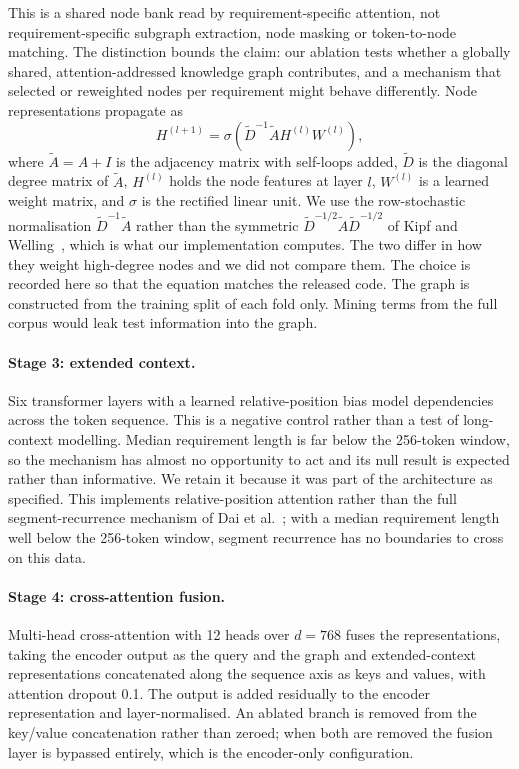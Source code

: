\documentclass[11pt,a4paper]{article}
\begin{document}
This is a shared node bank read by requirement-specific attention, not requirement-specific subgraph
extraction, node masking or token-to-node matching. The distinction bounds the claim: our ablation tests
whether a globally shared, attention-addressed knowledge graph contributes, and a mechanism that selected
or reweighted nodes per requirement might behave differently. Node representations propagate as
\begin{equation}
H^{(l+1)} = \sigma\!\left(\tilde{D}^{-1} \tilde{A} H^{(l)} W^{(l)}\right),
\end{equation}
where $\tilde{A} = A + I$ is the adjacency matrix with self-loops added, $\tilde{D}$ is the
diagonal degree matrix of $\tilde{A}$, $H^{(l)}$ holds the node features at layer $l$,
$W^{(l)}$ is a learned weight matrix, and $\sigma$ is the rectified linear unit. We use the
row-stochastic normalisation $\tilde{D}^{-1}\tilde{A}$ rather than the symmetric
$\tilde{D}^{-1/2}\tilde{A}\tilde{D}^{-1/2}$ of Kipf and Welling~\cite{kipf2017}, which is
what our implementation computes. The two differ in how they weight high-degree nodes and
we did not compare them. The choice is recorded here so that the equation matches the
released code. The graph
is constructed from the training split of each fold only. Mining terms from the full corpus would leak test information into the graph.

\paragraph{Stage 3: extended context.}
Six transformer layers with a learned relative-position bias model dependencies across the
token sequence. This is a negative control rather than a test of long-context modelling. Median requirement
length is far below the 256-token window, so the mechanism has almost no opportunity to act
and its null result is expected rather than informative. We retain it because it was part of
the architecture as specified. This implements relative-position attention rather than the full
segment-recurrence mechanism of Dai et al.~\cite{dai2019}; with a median requirement
length well below the 256-token window, segment recurrence has no boundaries to cross on
this data.

\paragraph{Stage 4: cross-attention fusion.}
Multi-head cross-attention with 12 heads over $d = 768$ fuses the representations, taking the
encoder output as the query and the graph and extended-context representations concatenated
along the sequence axis as keys and values, with attention dropout 0.1. The output is added
residually to the encoder representation and layer-normalised. An ablated branch is removed
from the key/value concatenation rather than zeroed; when both are removed the fusion layer is
bypassed entirely, which is the encoder-only configuration.
\end{document}
